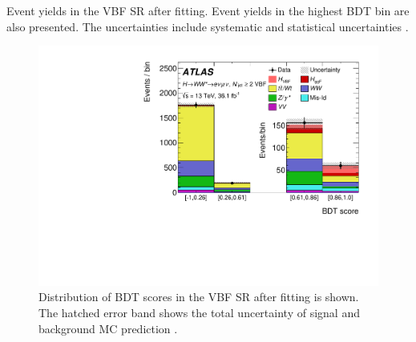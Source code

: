 
\begin{table}[!h]
	\centering
	\caption{ 
		Event yields in the VBF SR after fitting. Event yields in the highest BDT bin are also presented. The uncertainties include systematic and statistical uncertainties \cite{HWWRun2Paper}.}
	\label{tab:ggF_VBF_yields}
	\scalebox{0.8}{
		
	}
\end{table}


\begin{figure}[!h]
\centering
\includegraphics[width=0.45\linewidth, angle=-90]{Figures/VBFAnalysis/BDT_newStyle_V03}
\caption{Distribution of BDT scores in the VBF SR after fitting is shown. The hatched error band shows the total uncertainty of signal and background MC prediction \cite{HWWRun2Paper}.}
\label{fig:BDT_newStyle_V03}
\end{figure}

